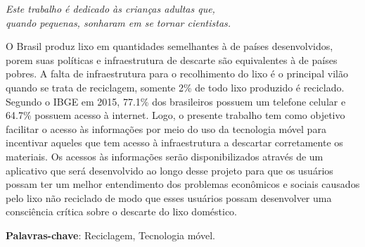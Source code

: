 \documentclass[
	12pt,				%
	openright,			%
	twoside,			%
	a4paper,			%
	english,			%
	french,				%
	spanish,			%
	brazil				%
	]{abntex2}
\begin{document}
\begin{dedicatoria}
   \vspace*{\fill}
   \centering
   \noindent
   \textit{ Este trabalho é dedicado às crianças adultas que,\\
   quando pequenas, sonharam em se tornar cientistas.} \vspace*{\fill}
\end{dedicatoria}

\begin{agradecimentos}


\end{agradecimentos}





\setlength{\absparsep}{18pt} %
\begin{resumo}

 O Brasil produz lixo em quantidades semelhantes à de países desenvolvidos, porem suas políticas e infraestrutura de descarte são equivalentes à de países pobres. A falta de infraestrutura para o recolhimento do lixo é o principal vilão quando se trata de reciclagem, somente 2\% de todo lixo produzido é reciclado.
	Segundo o IBGE em 2015, 77.1\% dos brasileiros possuem um telefone celular e 64.7\% possuem acesso à internet. Logo, o presente trabalho tem como objetivo facilitar o acesso às informações por meio do uso da tecnologia móvel para incentivar aqueles que tem acesso à infraestrutura a descartar corretamente os materiais. Os acessos às informações serão disponibilizados através de um aplicativo que será desenvolvido ao longo desse projeto para que os usuários possam ter um melhor entendimento dos problemas econômicos e sociais causados pelo lixo não reciclado de modo que esses usuários possam desenvolver uma consciência crítica sobre o descarte do lixo doméstico.


 \textbf{Palavras-chave}: Reciclagem, Tecnologia móvel.
\end{resumo}
\end{document}

